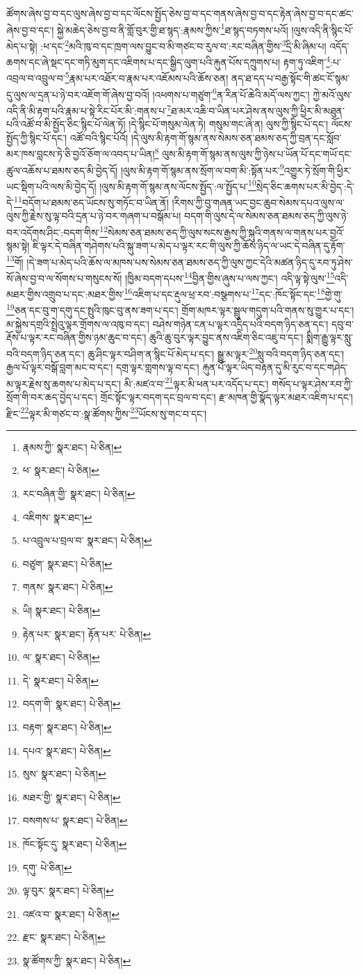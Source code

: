 ཚོགས་ཞེས་བྱ་བ་དང་ལུས་ཞེས་བྱ་བ་དང་ལོངས་སྤྱོད་ཅེས་བྱ་བ་དང་གནས་ཞེས་བྱ་བ་དང་རྟེན་ཞེས་བྱ་བ་དང་ཚང་ཞེས་བྱ་བ་དང་། སྐྱེ་མཆེད་ཅེས་བྱ་བ་ནི་གློ་བུར་གྱི་ཐ་སྙད་:རྣམས་ཀྱིས་\footnote{རྣམས་ཀྱི་  སྣར་ཐང་།  པེ་ཅིན། }ཐ་སྙད་བཏགས་པའོ། །ལུས་འདི་ནི་སྙིང་པོ་མེད་པ་སྟེ། :ཕ་དང་\footnote{ཕ་  སྣར་ཐང་།  པེ་ཅིན། }མའི་ཁུ་བ་དང་ཁྲག་ལས་བྱུང་བ་མི་གཙང་བ་རུལ་བ་:རང་བཞིན་གྱིས་\footnote{རང་བཞིན་གྱི་  སྣར་ཐང་།  པེ་ཅིན། }དྲི་མི་ཞིམ་པ། འདོད་ཆགས་དང་ཞེ་སྡང་དང་གཏི་མུག་དང་འཇིགས་པ་དང་སྒྱིད་ལུག་པའི་རྐུན་པོས་དཀྲུགས་པ། རྟག་ཏུ་འཇིག་\footnote{འཇིགས་  སྣར་ཐང་། }:པ་འབྲལ་བ་འབྲུལ་བ་\footnote{པ་འབྲུལ་པ་བྲལ་བ་  སྣར་ཐང་།  པེ་ཅིན། }རྣམ་པར་འཐོར་བ་རྣམ་པར་འཇོམས་པའི་ཆོས་ཅན། ནད་ཐ་དད་པ་བརྒྱ་སྟོང་གི་ཚང་ངོ་སྙམ་དུ་ལུས་ལ་དྲན་པ་ཉེ་བར་འཇོག་གོ་ཞེས་བྱ་བའོ། །འཕགས་པ་གཙུག་\footnote{བཙུག་  སྣར་ཐང་།  པེ་ཅིན། }ན་རིན་པོ་ཆེའི་མདོ་ལས་ཀྱང་། ཀྱེ་མའོ་ལུས་འདི་ནི་མི་རྟག་པའི་རྣམ་པ་སྟེ་རིང་པོར་མི་:གནས་པ་\footnote{གནས་  སྣར་ཐང་།  པེ་ཅིན། }ཐ་མར་འཆི་བ་ཡིན་པར་ཤེས་ནས་ལུས་ཀྱི་ཕྱིར་མི་མཐུན་པའི་འཚོ་བ་མི་སྤྱོད་ཅིང་སྙིང་པོ་ལེན་ཏོ། །དེ་སྙིང་པོ་གསུམ་ལེན་ཏེ། གསུམ་གང་ཞེ་ན། ལུས་ཀྱི་སྙིང་པོ་དང་། ལོངས་སྤྱོད་ཀྱི་སྙིང་པོ་དང་། འཚོ་བའི་སྙིང་པོའོ། །དེ་ལུས་མི་རྟག་གོ་སྙམ་ནས་སེམས་ཅན་ཐམས་ཅད་ཀྱི་བྲན་དང་སློབ་མར་ཁས་བླངས་ཏེ་ཅི་བྱའོ་ཅོག་ལ་འབད་པ་ཡིན།\footnote{ཡི།  སྣར་ཐང་།  པེ་ཅིན། } ལུས་མི་རྟག་གོ་སྙམ་ནས་ལུས་ཀྱི་ཉེས་པ་ཡོན་པོ་དང་གཡོ་དང་ཚུལ་འཆོས་པ་ཐམས་ཅད་མི་བྱེད་དོ། །ལུས་མི་རྟག་གོ་སྙམ་ནས་སྲོག་ལ་བག་མི་:སྟོན་པར་\footnote{རྟེན་པར་  སྣར་ཐང་། རྟོན་པར་  པེ་ཅིན། }འགྱུར་ཏེ་སྲོག་གི་ཕྱིར་ཡང་སྡིག་པའི་ལས་མི་བྱེད་དོ། །ལུས་མི་རྟག་གོ་སྙམ་ནས་ལོངས་སྤྱོད་:ལ་སྤྱོད་པ་\footnote{ལ་  སྣར་ཐང་།  པེ་ཅིན། }སྲེད་ཅིང་ཆགས་པར་མི་བྱེད་:དེ་དེ་\footnote{དེ་  སྣར་ཐང་།  པེ་ཅིན། }བདོག་པ་ཐམས་ཅད་ཡོངས་སུ་གཏོང་བ་ཡིན་ནོ། །རིགས་ཀྱི་བུ་གཞན་ཡང་བྱང་ཆུབ་སེམས་དཔའ་ལུས་ལ་ལུས་ཀྱི་རྗེས་སུ་ལྟ་བའི་དྲན་པ་ཉེ་བར་གཞག་པ་བསྒོམ་པ། བདག་གི་ལུས་དེ་ལ་སེམས་ཅན་ཐམས་ཅད་ཀྱི་ལུས་ཉེ་བར་འདོགས་ཤིང་:བདག་གིས་\footnote{བདག་གི་  སྣར་ཐང་།  པེ་ཅིན། }སེམས་ཅན་ཐམས་ཅད་ཀྱི་ལུས་སངས་རྒྱས་ཀྱི་སྐུའི་གནས་ལ་གནས་པར་བྱའོ་སྙམ་སྟེ། ཇི་ལྟར་དེ་བཞིན་གཤེགས་པའི་སྐུ་ཟག་པ་མེད་པ་ལྟར་རང་གི་ལུས་ཀྱི་ཆོས་ཉིད་ལ་ཡང་དེ་བཞིན་དུ་རྟོག་\footnote{བརྟག་  སྣར་ཐང་།  པེ་ཅིན། }གོ། །དེ་ཟག་པ་མེད་པའི་ཆོས་ལ་མཁས་པས་སེམས་ཅན་ཐམས་ཅད་ཀྱི་ལུས་ཀྱང་དེའི་མཚན་ཉིད་དུ་རབ་ཏུ་ཤེས་སོ་ཞེས་བྱ་བ་ལ་སོགས་པ་གསུངས་སོ། །ཁྱིམ་བདག་དཔས་\footnote{དཔའ་  སྣར་ཐང་།  པེ་ཅིན། }བྱིན་གྱིས་ཞུས་པ་ལས་ཀྱང་། འདི་ལྟ་སྟེ་ལུས་\footnote{སུས་  སྣར་ཐང་།  པེ་ཅིན། }འདི་མཐར་གྱིས་འགྲུབ་པ་དང་:མཐར་གྱིས་\footnote{མཐར་གྱི་  སྣར་ཐང་།  པེ་ཅིན། }འཇིག་པ་དང་རྡུལ་ཕྲ་རབ་:བསྩགས་པ་\footnote{བསགས་པ་  སྣར་ཐང་།  པེ་ཅིན། }དང་:ཁོང་སྟོང་དང་\footnote{ཁོང་སྟོང་དུ་  སྣར་ཐང་།  པེ་ཅིན། }གྱེ་གུ་\footnote{དགུ་  པེ་ཅིན། }ཅན་དང་བུ་ག་དགུ་དང་སྤུའི་ཁུང་བུ་ནས་ཟག་པ་དང་། གྲོག་མཁར་ལྟར་སྦྲུལ་གདུག་པའི་གནས་སུ་གྱུར་པ་དང་། མ་སྐྱེས་དགྲའི་སྤྲེའུ་ལྟར་གྲོགས་ལ་འཁུ་བ་དང་། བཤེས་གཉེན་ངན་པ་ལྟར་འདྲིད་པའི་བདག་ཉིད་ཅན་དང་། དབུ་བ་རྡོས་པ་ལྟར་རང་བཞིན་གྱིས་ཉམ་ཆུང་བ་དང་། ཆུའི་ཆུ་བུར་ལྟར་བྱུང་ནས་འཇིག་ཅིང་འཇུ་བ་དང་། སྨིག་རྒྱུ་ལྟར་སླུ་བའི་བདག་ཉིད་ཅན་དང་། ཆུ་ཤིང་ལྟར་བཤིག་ན་སྙིང་པོ་མེད་པ་དང་། སྒྱུ་མ་ལྟར་\footnote{ལྟ་བུར་  སྣར་ཐང་།  པེ་ཅིན། }སླུ་བའི་བདག་ཉིད་ཅན་དང་། རྒྱལ་པོ་ལྟར་བསྒོ་བླག་མང་བ་དང་། དགྲ་ལྟར་གླགས་ལྟ་བ་དང་། རྐུན་པོ་ལྟར་ཡིད་བརྟན་དུ་མི་རུང་བ་དང་གཤེད་མ་ལྟར་རྗེས་སུ་ཆགས་པ་མེད་པ་དང་། མི་:མཛའ་བ་\footnote{འཛའ་བ་  སྣར་ཐང་།  པེ་ཅིན། }ལྟར་མི་ཕན་པར་འདོད་པ་དང་། གསོད་པ་ལྟར་ཤེས་རབ་ཀྱི་སྲོག་གི་བར་ཆད་བྱེད་པ་དང་། གྲོང་སྟོང་ལྟར་བདག་དང་བྲལ་བ་དང་། རྫ་མཁན་གྱི་སྣོད་ལྟར་མཐར་འཇིག་པ་དང་། རྫིང་\footnote{རྫང་  སྣར་ཐང་།  པེ་ཅིན། }ལྟར་མི་གཙང་བ་:སྣ་ཚོགས་ཀྱིས་\footnote{སྣ་ཚོགས་ཀྱི་  སྣར་ཐང་།  པེ་ཅིན། }ཡོངས་སུ་གང་བ་དང་། 